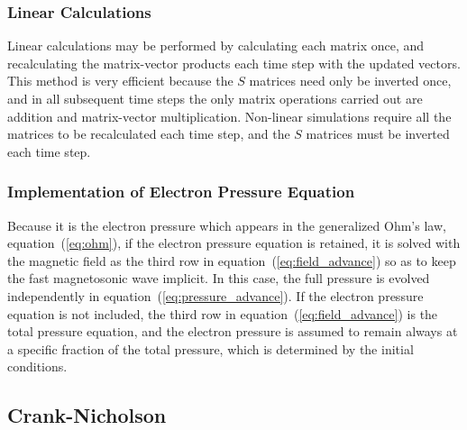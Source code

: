 \documentclass[draft]{book}
\begin{document}
\subsubsection{Linear Calculations}

Linear calculations may be performed by calculating each matrix once,
and recalculating the matrix-vector products each time step with the
updated vectors.  This method is very efficient because the $S$
matrices need only be inverted once, and in all subsequent time steps
the only matrix operations carried out are addition and matrix-vector
multiplication.  Non-linear simulations require all the matrices to be
recalculated each time step, and the $S$ matrices must be inverted
each time step.

\subsubsection{Implementation of Electron Pressure Equation}

Because it is the electron pressure which appears in the generalized
Ohm's law, equation~(\ref{eq:ohm}), if the electron pressure equation
is retained, it is solved with the magnetic field as the third row in
equation~(\ref{eq:field_advance}) so as to keep the fast magnetosonic
wave implicit.  In this case, the full pressure is evolved
independently in equation~(\ref{eq:pressure_advance}).  If the
electron pressure equation is not included, the third row in
equation~(\ref{eq:field_advance}) is the total pressure equation, and
the electron pressure is assumed to remain always at a specific
fraction of the total pressure, which is determined by the initial
conditions.


\subsection{Crank-Nicholson}
\end{document}
